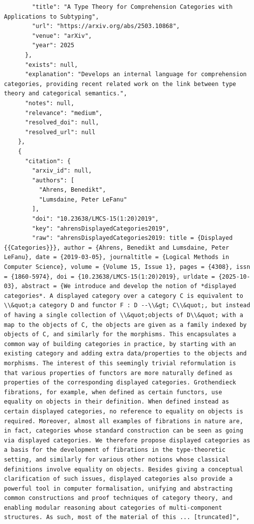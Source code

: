 \documentclass[11pt]{article}
\begin{document}
\begin{verbatim}
        "title": "A Type Theory for Comprehension Categories with Applications to Subtyping",
        "url": "https://arxiv.org/abs/2503.10868",
        "venue": "arXiv",
        "year": 2025
      },
      "exists": null,
      "explanation": "Develops an internal language for comprehension categories, providing recent related work on the link between type theory and categorical semantics.",
      "notes": null,
      "relevance": "medium",
      "resolved_doi": null,
      "resolved_url": null
    },
    {
      "citation": {
        "arxiv_id": null,
        "authors": [
          "Ahrens, Benedikt",
          "Lumsdaine, Peter LeFanu"
        ],
        "doi": "10.23638/LMCS-15(1:20)2019",
        "key": "ahrensDisplayedCategories2019",
        "raw": "ahrensDisplayedCategories2019: title = {Displayed {{Categories}}}, author = {Ahrens, Benedikt and Lumsdaine, Peter LeFanu}, date = {2019-03-05}, journaltitle = {Logical Methods in Computer Science}, volume = {Volume 15, Issue 1}, pages = {4308}, issn = {1860-5974}, doi = {10.23638/LMCS-15(1:20)2019}, urldate = {2025-10-03}, abstract = {We introduce and develop the notion of *displayed categories*. A displayed category over a category C is equivalent to \\&quot;a category D and functor F : D --\\&gt; C\\&quot;, but instead of having a single collection of \\&quot;objects of D\\&quot; with a map to the objects of C, the objects are given as a family indexed by objects of C, and similarly for the morphisms. This encapsulates a common way of building categories in practice, by starting with an existing category and adding extra data/properties to the objects and morphisms. The interest of this seemingly trivial reformulation is that various properties of functors are more naturally defined as properties of the corresponding displayed categories. Grothendieck fibrations, for example, when defined as certain functors, use equality on objects in their definition. When defined instead as certain displayed categories, no reference to equality on objects is required. Moreover, almost all examples of fibrations in nature are, in fact, categories whose standard construction can be seen as going via displayed categories. We therefore propose displayed categories as a basis for the development of fibrations in the type-theoretic setting, and similarly for various other notions whose classical definitions involve equality on objects. Besides giving a conceptual clarification of such issues, displayed categories also provide a powerful tool in computer formalisation, unifying and abstracting common constructions and proof techniques of category theory, and enabling modular reasoning about categories of multi-component structures. As such, most of the material of this ... [truncated]",

\end{verbatim}
\end{document}
